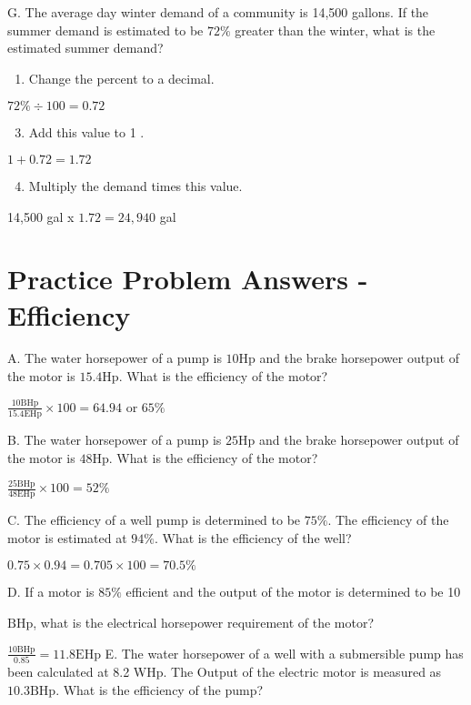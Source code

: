 G. The average day winter demand of a community is 14,500 gallons. If the summer demand is estimated to be $72 \%$ greater than the winter, what is the estimated summer demand?

\begin{enumerate}
  \item Change the percent to a decimal.
\end{enumerate}
$72 \% \div 100=0.72$

\begin{enumerate}
  \setcounter{enumi}{2}
  \item Add this value to 1 .
\end{enumerate}
$1+0.72=1.72$

\begin{enumerate}
  \setcounter{enumi}{3}
  \item Multiply the demand times this value.
\end{enumerate}
14,500 gal x $1.72=24,940$ gal

\section{Practice Problem Answers - Efficiency}
A. The water horsepower of a pump is $10 \mathrm{Hp}$ and the brake horsepower output of the motor is $15.4 \mathrm{Hp}$. What is the efficiency of the motor?

$\frac{10 \mathrm{BHp}}{15.4 \mathrm{EHp}} \times 100=64.94$ or $65 \%$

B. The water horsepower of a pump is $25 \mathrm{Hp}$ and the brake horsepower output of the motor is $48 \mathrm{Hp}$. What is the efficiency of the motor?

$\frac{25 \mathrm{BHp}}{48 \mathrm{EHp}} \times 100=52 \%$

C. The efficiency of a well pump is determined to be $75 \%$. The efficiency of the motor is estimated at $94 \%$. What is the efficiency of the well?

$0.75 \times 0.94=0.705 \times 100=70.5 \%$

D. If a motor is $85 \%$ efficient and the output of the motor is determined to be 10

$\mathrm{BHp}$, what is the electrical horsepower requirement of the motor?

$\frac{10 \mathrm{BHp}}{0.85}=11.8 \mathrm{EHp}$ E. The water horsepower of a well with a submersible pump has been calculated at 8.2 WHp. The Output of the electric motor is measured as $10.3 \mathrm{BHp}$. What is the efficiency of the pump?

